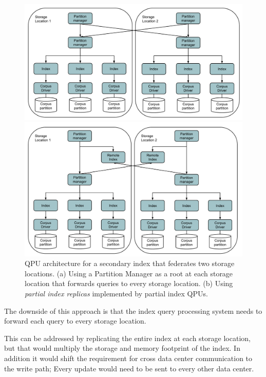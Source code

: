 \begin{figure}
  \begin{minipage}{.5\textwidth}
    \centering
    \includegraphics[scale=0.24]{./figures/case_studies/federated_index.pdf}
  \end{minipage}%
  \begin{minipage}{.5\textwidth}
    \centering
    \includegraphics[scale=0.24]{./figures/case_studies/federated_index_remote.pdf}
  \end{minipage}
  \caption{QPU architecture for a secondary index that federates two storage locations.
  (a) Using a Partition Manager as a root at each storage location that forwards queries to every storage location.
  (b) Using \textit{partial index replicas} implemented by partial index QPUs.}
  \label{fig:federated_index}
\end{figure}

The downside of this approach is that the index query processing system needs to forward each query to every
storage location.

This can be addressed by replicating the entire index at each storage location,
but that would multiply the storage and memory footprint of the index.
In addition it would shift the requirement for cross data center communication to the write path;
Every update would need to be sent to every other data center.


